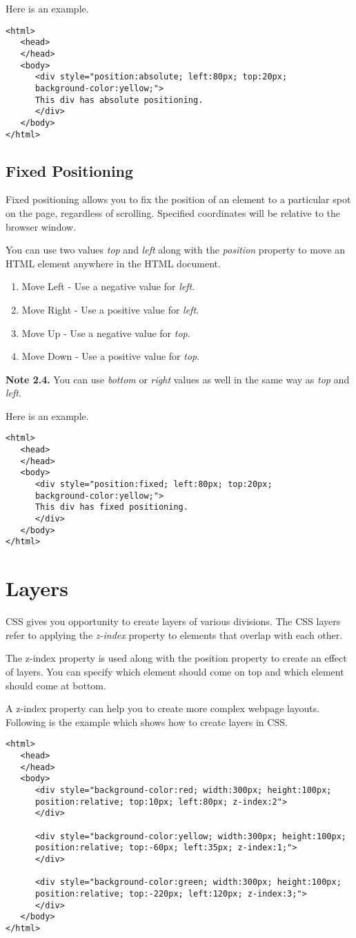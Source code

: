 \documentclass[a4paper,oneside]{book}
\numberwithin{equation}{chapter}
\begin{document}
Here is an example.
\begin{verbatim}
<html>
   <head>
   </head>
   <body>
      <div style="position:absolute; left:80px; top:20px; 
      background-color:yellow;">
      This div has absolute positioning.
      </div>
   </body>
</html> 
\end{verbatim}
\subsection{Fixed Positioning}
Fixed positioning allows you to fix the position of an element to a particular spot on the page, regardless of scrolling. Specified coordinates will be relative to the browser window.

You can use two values \textit{top} and \textit{left} along with the \textit{position} property to move an HTML element anywhere in the HTML document.
\begin{enumerate}
\item Move Left - Use a negative value for \textit{left}.
\item Move Right - Use a positive value for \textit{left}.
\item Move Up - Use a negative value for \textit{top}.
\item Move Down - Use a positive value for \textit{top}.
\end{enumerate}
\textbf{Note 2.4.} You can use \textit{bottom} or \textit{right} values as well in the same way as \textit{top} and \textit{left}.

Here is an example.
\begin{verbatim}
<html>
   <head>
   </head>
   <body>
      <div style="position:fixed; left:80px; top:20px; 
      background-color:yellow;">
      This div has fixed positioning.
      </div>
   </body>
</html>
\end{verbatim}
\section{Layers}
CSS gives you opportunity to create layers of various divisions. The CSS layers refer to applying the \textit{z-index} property to elements that overlap with each other.

The z-index property is used along with the position property to create an effect of layers. You can specify which element should come on top and which element should come at bottom.

A z-index property can help you to create more complex webpage layouts. Following is the example which shows how to create layers in CSS.
\begin{verbatim}
<html>
   <head>
   </head>
   <body>
      <div style="background-color:red; width:300px; height:100px; 
      position:relative; top:10px; left:80px; z-index:2">
      </div>
      
      <div style="background-color:yellow; width:300px; height:100px; 
      position:relative; top:-60px; left:35px; z-index:1;">
      </div>
      
      <div style="background-color:green; width:300px; height:100px; 
      position:relative; top:-220px; left:120px; z-index:3;">
      </div>
   </body>
</html> 
\end{verbatim}
\end{document}
